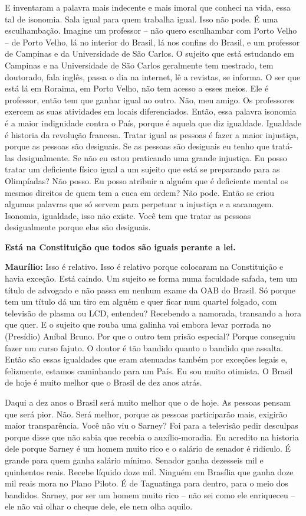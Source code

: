 E inventaram a palavra mais indecente e mais imoral que conheci na vida,
essa tal de isonomia. Sala igual para quem trabalha igual. Isso não
pode. É uma esculhambação. Imagine um professor -- não quero esculhambar
com Porto Velho -- de Porto Velho, lá no interior do Brasil, lá nos
confins do Brasil, e um professor de Campinas e da Universidade de São
Carlos. O sujeito que está estudando em Campinas e na Universidade de
São Carlos geralmente tem mestrado, tem doutorado, fala inglês, passa o
dia na internet, lê a revistas, se informa. O ser que está lá em
Roraima, em Porto Velho, não tem acesso a esses meios. Ele é professor,
então tem que ganhar igual ao outro. Não, meu amigo. Os professores
exercem as suas atividades em locais diferenciados. Então, essa palavra
isonomia é a maior indignidade contra o País, porque é aquela que diz
igualdade. Igualdade é historia da revolução francesa. Tratar igual as
pessoas é fazer a maior injustiça, porque as pessoas são desiguais. Se
as pessoas são desiguais eu tenho que tratá-las desigualmente. Se não eu
estou praticando uma grande injustiça. Eu posso tratar um deficiente
físico igual a um sujeito que está se preparando para as Olimpíadas? Não
posso. Eu posso atribuir a alguém que é deficiente mental os mesmos
direitos de quem tem a cuca em ordem? Não pode. Então se criou algumas
palavras que só servem para perpetuar a injustiça e a sacanagem.
Isonomia, igualdade, isso não existe. Você tem que tratar as pessoas
desigualmente porque elas são desiguais.

\textbf{Está na Constituição que todos são iguais perante a lei.}

\textbf{Maurílio:} Isso é relativo. Isso é relativo porque colocaram na
Constituição e havia exceção. Está caindo. Um sujeito se forma numa
faculdade safada, tem um título de advogado e não passa em nenhum exame
da OAB do Brasil. Só porque tem um título dá um tiro em alguém e quer
ficar num quartel folgado, com televisão de plasma ou LCD, entendeu?
Recebendo a namorada, transando a hora que quer. E o sujeito que rouba
uma galinha vai embora levar porrada no (Presídio) Aníbal Bruno. Por que
o outro tem prisão especial? Porque conseguiu fazer um curso fajuto. O
doutor é tão bandido quanto o bandido que assalta. Então são essas
igualdades que eram atenuadas também por exceções legais e, felizmente,
estamos caminhando para um País. Eu sou muito otimista. O Brasil de hoje
é muito melhor que o Brasil de dez anos atrás.

Daqui a dez anos o Brasil será muito melhor que o de hoje. As pessoas
pensam que será pior. Não. Será melhor, porque as pessoas participarão
mais, exigirão maior transparência. Você não viu o Sarney? Foi para a
televisão pedir desculpas porque disse que não sabia que recebia o
auxílio-moradia. Eu acredito na historia dele porque Sarney é um homem
muito rico e o salário de senador é ridículo. É grande para quem ganha
salário mínimo. Senador ganha dezesseis mil e quinhentos reais. Recebe
líquido doze mil. Ninguém em Brasília que ganha doze mil reais mora no
Plano Piloto. É de Taguatinga para dentro, para o meio dos bandidos.
Sarney, por ser um homem muito rico -- não sei como ele enriqueceu --
ele não vai olhar o cheque dele, ele nem olha aquilo.

